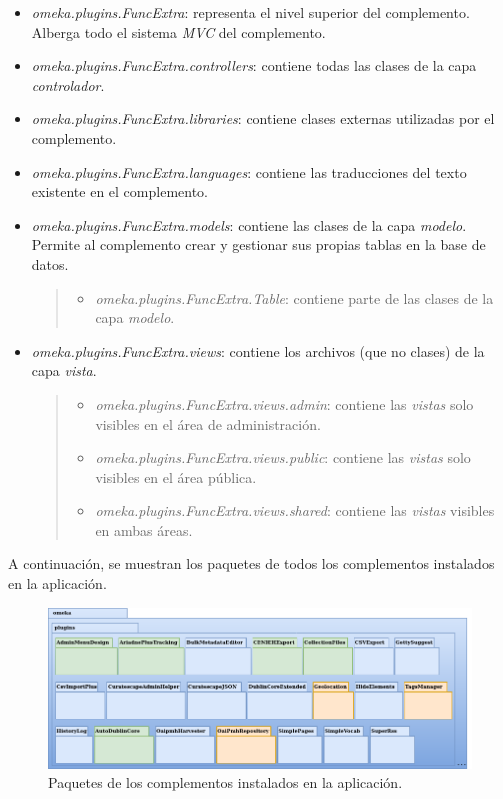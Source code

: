 \documentclass[
]{article}
\providecommand{\tightlist}{%
  \setlength{\itemsep}{0pt}\setlength{\parskip}{0pt}}
\begin{document}
\begin{itemize}
\item
  \emph{omeka.plugins.FuncExtra}: representa el nivel superior del
  complemento. Alberga todo el sistema \emph{MVC} del complemento.
\item
  \emph{omeka.plugins.FuncExtra.controllers}: contiene todas las clases
  de la capa \emph{controlador}.
\item
  \emph{omeka.plugins.FuncExtra.libraries}: contiene clases externas
  utilizadas por el complemento.
\item
  \emph{omeka.plugins.FuncExtra.languages}: contiene las traducciones
  del texto existente en el complemento.
\item
  \emph{omeka.plugins.FuncExtra.models}: contiene las clases de la capa
  \emph{modelo}. Permite al complemento crear y gestionar sus propias
  tablas en la base de datos.

  \begin{quote}
  \begin{itemize}
  \tightlist
  \item
    \emph{omeka.plugins.FuncExtra.Table}: contiene parte de las clases
    de la capa \emph{modelo}.
  \end{itemize}
  \end{quote}
\item
  \emph{omeka.plugins.FuncExtra.views}: contiene los archivos (que no
  clases) de la capa \emph{vista}.

  \begin{quote}
  \begin{itemize}
  \tightlist
  \item
    \emph{omeka.plugins.FuncExtra.views.admin}: contiene las
    \emph{vistas} solo visibles en el área de administración.
  \item
    \emph{omeka.plugins.FuncExtra.views.public}: contiene las
    \emph{vistas} solo visibles en el área pública.
  \item
    \emph{omeka.plugins.FuncExtra.views.shared}: contiene las
    \emph{vistas} visibles en ambas áreas.
  \end{itemize}
  \end{quote}
\end{itemize}

A continuación, se muestran los paquetes de todos los complementos
instalados en la aplicación.

\begin{figure}
\hypertarget{da-pck-2-1}{%
\centering
\includegraphics{../_static/images/pck-2-1.png}
\caption{Paquetes de los complementos instalados en la
aplicación.}\label{da-pck-2-1}
}
\end{figure}
\end{document}
